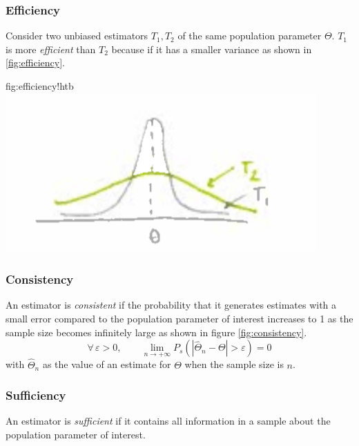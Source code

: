 	\subsubsection{Efficiency}
		Consider two unbiased estimators $T_1,T_2$ of the same population parameter $\Theta$. $T_1$ is more \emph{efficient} than $T_2$ because if it has a smaller variance as shown in \ref{fig:efficiency}.
		\begin{fig}{fig:efficiency}{!htb}
			\includegraphics[width=\textwidth,trim={0cm 0cm 0cm .5cm},clip]{P08efficiency.png}
		\end{fig}		
	\subsubsection{Consistency}
		An estimator is \emph{consistent} if the probability that it generates estimates with a small error compared to the population parameter of interest increases to 1 as the sample size becomes infinitely large as shown in figure \ref{fig:consistency}.
		\begin{equation*}
			\forall\,\varepsilon > 0,\qquad \lim\limits_{n\rightarrow+\infty}P_s(|\hat{\Theta}_n-\Theta|>\varepsilon)=0
		\end{equation*}
		with $\hat{\Theta}_n$ as the value of an estimate for $\Theta$ when the sample size is $n$.
	\subsubsection{Sufficiency}
		An estimator is \emph{sufficient} if it contains all information in a sample about the population parameter of interest.
